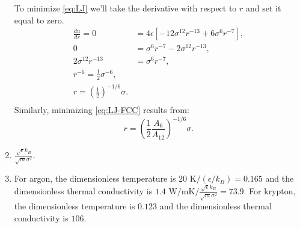 \documentclass{article}
\begin{document}
\begin{enumerate}[label=\alph*)]
    To minimize \eqref{eq:LJ} we'll take the derivative with respect to $r$ and set it equal to zero.
    \begin{align*}
      \frac{du}{dr} = 0 & = 4\epsilon\left[-12 \sigma^{12} r^{-13} + 6 \sigma^6 r^{-7} \right], \\
      0 & = \sigma^6 r^{-7} - 2 \sigma^{12} r^{-13}, \\
      2 \sigma^{12} r^{-13} & = \sigma^6 r^{-7}, \\
      r^{-6} = \frac{1}{2} \sigma^{-6}, \\
      r = \left(\frac{1}{2}\right)^{-1/6} \sigma. \\
    \end{align*}
    Similarly, minimizing \eqref{eq:LJ-FCC} results from:
    \begin{equation*}
      r = \left(\frac{1}{2}\frac{A_6}{A_{12}}\right)^{-1/6} \sigma.
    \end{equation*}
  \item $\frac{\sqrt{\epsilon} k_B}{\sqrt{m}\sigma^2}$.
  \item For argon, the dimensionless temperature is $20 \text{ K} / (\epsilon / k_B) = 0.165$ and the dimensionless thermal conductivity is $1.4 \text{ W} / \text{mK} / \frac{\sqrt{\epsilon} k_B}{\sqrt{m}\sigma^2} = 73.9$.
For krypton, the dimensionless temperature is $0.123$ and the dimensionless thermal conductivity is $106$.
\end{enumerate}



\end{document}
